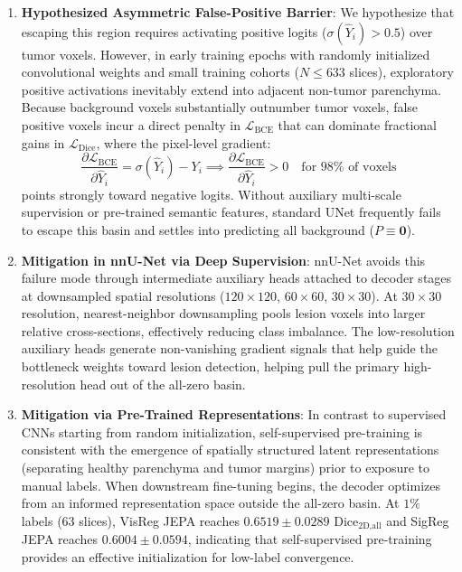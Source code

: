 \documentclass{article}
\begin{document}
\begin{enumerate}
    \item \textbf{Hypothesized Asymmetric False-Positive Barrier}: We hypothesize that escaping this region requires activating positive logits ($\sigma(\hat{Y}_i) > 0.5$) over tumor voxels. However, in early training epochs with randomly initialized convolutional weights and small training cohorts ($N \le 633$ slices), exploratory positive activations inevitably extend into adjacent non-tumor parenchyma. Because background voxels substantially outnumber tumor voxels, false positive voxels incur a direct penalty in $\mathcal{L}_{\text{BCE}}$ that can dominate fractional gains in $\mathcal{L}_{\text{Dice}}$, where the pixel-level gradient:
    \begin{equation}
        \frac{\partial \mathcal{L}_{\text{BCE}}}{\partial \hat{Y}_i} = \sigma(\hat{Y}_i) - Y_i \implies \frac{\partial \mathcal{L}_{\text{BCE}}}{\partial \hat{Y}_i} > 0 \quad \text{for } 98\% \text{ of voxels}
    \end{equation}
    points strongly toward negative logits. Without auxiliary multi-scale supervision or pre-trained semantic features, standard UNet frequently fails to escape this basin and settles into predicting all background ($P \equiv \mathbf{0}$).
    
    \item \textbf{Mitigation in nnU-Net via Deep Supervision}: nnU-Net avoids this failure mode through intermediate auxiliary heads attached to decoder stages at downsampled spatial resolutions ($120\times 120$, $60\times 60$, $30\times 30$). At $30 \times 30$ resolution, nearest-neighbor downsampling pools lesion voxels into larger relative cross-sections, effectively reducing class imbalance. The low-resolution auxiliary heads generate non-vanishing gradient signals that help guide the bottleneck weights toward lesion detection, helping pull the primary high-resolution head out of the all-zero basin.
    
    \item \textbf{Mitigation via Pre-Trained Representations}: In contrast to supervised CNNs starting from random initialization, self-supervised pre-training is consistent with the emergence of spatially structured latent representations (separating healthy parenchyma and tumor margins) prior to exposure to manual labels. When downstream fine-tuning begins, the decoder optimizes from an informed representation space outside the all-zero basin. At $1\%$ labels ($63$ slices), VisReg JEPA reaches $\mathbf{0.6519 \pm 0.0289}$ $\text{Dice}_{\text{2D,all}}$ and SigReg JEPA reaches $0.6004 \pm 0.0594$, indicating that self-supervised pre-training provides an effective initialization for low-label convergence.
\end{enumerate}
\end{document}
